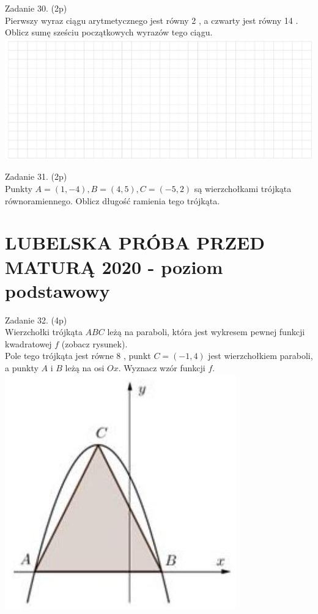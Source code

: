 \documentclass[10pt]{article}
\begin{document}
Zadanie 30. (2p)\\
Pierwszy wyraz ciągu arytmetycznego jest równy 2 , a czwarty jest równy 14 . Oblicz sumę sześciu początkowych wyrazów tego ciągu.\\
\includegraphics[max width=\textwidth, center]{2024_11_21_e376e4ee4a8b7ab03731g-10}

Zadanie 31. (2p)\\
Punkty \(A=(1,-4), B=(4,5), C=(-5,2)\) są wierzchołkami trójkąta równoramiennego. Oblicz długość ramienia tego trójkąta.

\section*{LUBELSKA PRÓBA PRZED MATURĄ 2020 - poziom podstawowy}
Zadanie 32. (4p)\\
Wierzchołki trójkąta \(A B C\) leżą na paraboli, która jest wykresem pewnej funkcji kwadratowej \(f\) (zobacz rysunek).\\
Pole tego trójkąta jest równe 8 , punkt \(C=(-1,4)\) jest wierzchołkiem paraboli, a punkty \(A\) i \(B\) leżą na osi \(O x\). Wyznacz wzór funkcji \(f\).\\
\includegraphics[max width=\textwidth, center]{2024_11_21_e376e4ee4a8b7ab03731g-11}
\end{document}
